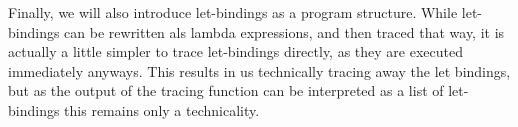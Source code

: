         \begin{prooftree}
        \end{prooftree}

        \begin{prooftree}
        \end{prooftree}

        Finally, we will also introduce let-bindings as a program structure.
        While let-bindings can be rewritten als lambda expressions, and then traced that way, it is actually a little simpler to trace let-bindings directly, as they are executed immediately anyways.
        This results in us technically tracing away the let bindings, but as the output of the tracing function can be interpreted as a list of let-bindings this remains only a technicality.

        \begin{prooftree}
        \end{prooftree}

        \begin{prooftree}
        \end{prooftree}
        
        \begin{prooftree}
        \end{prooftree}

